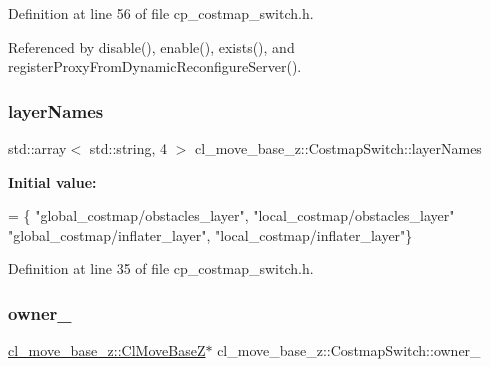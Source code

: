 Definition at line 56 of file cp\+\_\+costmap\+\_\+switch.\+h.



Referenced by disable(), enable(), exists(), and register\+Proxy\+From\+Dynamic\+Reconfigure\+Server().

\mbox{\label{classcl__move__base__z_1_1CostmapSwitch_aee0c75c8f4459cacaf583ef8c90ff329}} 
\subsubsection{\texorpdfstring{layer\+Names}{layerNames}}
{\footnotesize\ttfamily std\+::array$<$ std\+::string, 4 $>$ cl\+\_\+move\+\_\+base\+\_\+z\+::\+Costmap\+Switch\+::layer\+Names\hspace{0.3cm}{\ttfamily [static]}}

{\bfseries Initial value\+:}
\begin{DoxyCode}
=
        \{
            \textcolor{stringliteral}{"global\_costmap/obstacles\_layer"},
            \textcolor{stringliteral}{"local\_costmap/obstacles\_layer"}
            \textcolor{stringliteral}{"global\_costmap/inflater\_layer"},
            \textcolor{stringliteral}{"local\_costmap/inflater\_layer"}\}
\end{DoxyCode}


Definition at line 35 of file cp\+\_\+costmap\+\_\+switch.\+h.

\mbox{\label{classcl__move__base__z_1_1CostmapSwitch_a42a7da3f7301daa691ef1593ae926618}} 
\subsubsection{\texorpdfstring{owner\+\_\+}{owner\_}}
{\footnotesize\ttfamily \hyperlink{classcl__move__base__z_1_1ClMoveBaseZ}{cl\+\_\+move\+\_\+base\+\_\+z\+::\+Cl\+Move\+BaseZ}$\ast$ cl\+\_\+move\+\_\+base\+\_\+z\+::\+Costmap\+Switch\+::owner\+\_\+\hspace{0.3cm}{\ttfamily [private]}}



